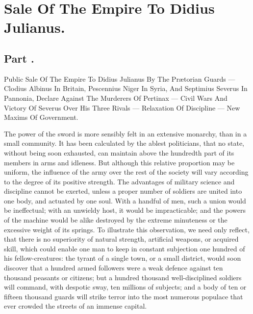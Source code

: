 \chapter{Sale Of The Empire To Didius Julianus.}
\section{Part \thesection.}

Public Sale Of The Empire To Didius Julianus By The Prætorian
Guards — Clodius Albinus In Britain, Pescennius Niger In Syria, And
Septimius Severus In Pannonia, Declare Against The Murderers Of
Pertinax — Civil Wars And Victory Of Severus Over His Three
Rivals — Relaxation Of Discipline — New Maxims Of Government.
\vspace{\onelineskip}

The power of the sword is more sensibly felt in an extensive
monarchy, than in a small community. It has been calculated by
the ablest politicians, that no state, without being soon
exhausted, can maintain above the hundredth part of its members
in arms and idleness. But although this relative proportion may
be uniform, the influence of the army over the rest of the
society will vary according to the degree of its positive
strength. The advantages of military science and discipline
cannot be exerted, unless a proper number of soldiers are united
into one body, and actuated by one soul. With a handful of men,
such a union would be ineffectual; with an unwieldy host, it
would be impracticable; and the powers of the machine would be
alike destroyed by the extreme minuteness or the excessive weight
of its springs. To illustrate this observation, we need only
reflect, that there is no superiority of natural strength,
artificial weapons, or acquired skill, which could enable one man
to keep in constant subjection one hundred of his
fellow-creatures: the tyrant of a single town, or a small
district, would soon discover that a hundred armed followers were
a weak defence against ten thousand peasants or citizens; but a
hundred thousand well-disciplined soldiers will command, with
despotic sway, ten millions of subjects; and a body of ten or
fifteen thousand guards will strike terror into the most numerous
populace that ever crowded the streets of an immense capital.

